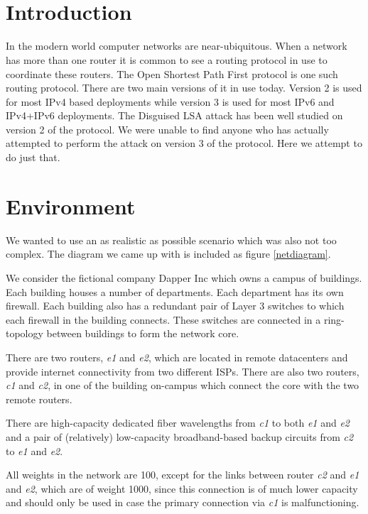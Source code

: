 \documentclass[11pt,a4paper,oneside]{article}
\title{\ftitle\\\coursecode { -} \coursename}
\author{\fauthor}
\newcommand{\lsection}[2]{\section{#1}\label{sec:#2}}
\begin{document}
    \maketitle\thispagestyle{fancy}
    \newpage
    \tableofcontents
    \newpage


    \lsection{Introduction}{intro}
    In the modern world computer networks are near-ubiquitous.
    When a network has more than one router it is common to see a routing protocol in use to coordinate these routers.
    The Open Shortest Path First protocol is one such routing protocol.
    There are two main versions of it in use today.
    Version 2 is used for most IPv4 based deployments while version 3 is used for most IPv6 and IPv4+IPv6 deployments.
    The Disguised LSA attack has been well studied on version 2 of the protocol.
    We were unable to find anyone who has actually attempted to perform the attack on version 3 of the protocol.
    Here we attempt to do just that.


    \lsection{Environment}{env_setup}
    We wanted to use an as realistic as possible scenario which was also not too complex.
    The diagram we came up with is included as figure \ref{netdiagram}.

    We consider the fictional company Dapper Inc which owns a campus of buildings.
    Each building houses a number of departments.
    Each department has its own firewall.
    Each building also has a redundant pair of Layer 3 switches to which each firewall in the building connects.
    These switches are connected in a ring-topology between buildings to form the network core.

    There are two routers, \textit{e1} and \textit{e2}, which are located in remote datacenters and provide internet connectivity from two different ISPs.
    There are also two routers, \textit{c1} and \textit{c2}, in one of the building on-campus which connect the core with the two remote routers.

    There are high-capacity dedicated fiber wavelengths from \textit{c1} to both \textit{e1} and \textit{e2} and a pair of (relatively) low-capacity broadband-based backup circuits from \textit{c2} to \textit{e1} and \textit{e2}.

    All weights in the network are 100, except for the links between router \textit{c2} and \textit{e1} and \textit{e2}, which are of weight 1000, since this connection is of much lower capacity and should only be used in case the primary connection via \textit{c1} is malfunctioning.
\end{document}

